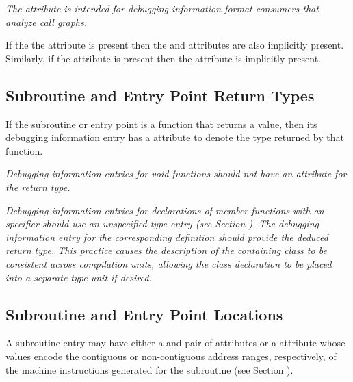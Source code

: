 \textit{The \DWATcallallsourcecallsNAME{} attribute is intended for debugging 
information format consumers that analyze call graphs.}

If the the \DWATcallallsourcecalls{} attribute is present then the 
\DWATcallallcalls{} and \DWATcallalltailcalls{} attributes are 
also implicitly present. Similarly, if the 
\DWATcallallcalls{} attribute is present then the \DWATcallalltailcalls{} 
attribute is implicitly present.

\subsection{Subroutine and Entry Point Return Types}
\label{chap:subroutineandentrypointreturntypes}

If\hypertarget{chap:DWATtypetypeofsubroutinereturn}{}
the subroutine or entry point 
is a function that returns a
value, then its debugging information entry has 
a \DWATtypeDEFN{} attribute 
to denote the type returned by that function.

\textit{Debugging information entries for 
 void functions should
not have an attribute for the return type.  }

\textit{Debugging information entries for declarations of  
member functions with an 
\autoreturntype{} specifier should use an unspecified type entry (see 
Section ). 
The debugging information entry for the corresponding definition
should provide the deduced return type.  This practice causes the description of
the containing class to be consistent across compilation units, allowing the class
declaration to be placed into a separate type unit if desired.}


\subsection{Subroutine and Entry Point Locations}
\label{chap:subroutineandentrypointlocations}

A subroutine entry may have either a \DWATlowpc{} and
\DWAThighpc{} pair of attributes or a \DWATranges{} attribute
whose 
values 
encode the contiguous or non-contiguous address
ranges, respectively, of the machine instructions generated
for the subroutine (see 
Section ).

